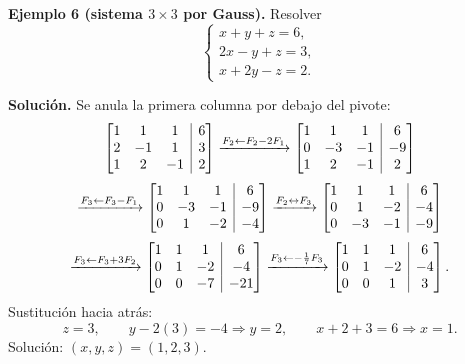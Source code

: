 \documentclass[12pt, letterpaper]{article}
\makeatletter
\newcommand{\mwaug}[2]{\ensuremath{\left[\begin{array}{@{}#1@{}}#2\end{array}\right]}}
\makeatother
\begin{document}
\begin{cuadrosolucion}
  \small
  \textbf{Ejemplo 6 (sistema $3\times3$ por Gauss).} Resolver
  \[
    \begin{cases}
      x+y+z=6,\\
      2x-y+z=3,\\
      x+2y-z=2.
    \end{cases}
  \]

  \medskip
  \textbf{Solución.} Se anula la primera columna por debajo del pivote:
  \[
    \mwaug{ccc|c}{1&1&1&6\\2&-1&1&3\\1&2&-1&2}
    \xrightarrow{F_2\leftarrow F_2-2F_1}
    \mwaug{ccc|c}{1&1&1&6\\0&-3&-1&-9\\1&2&-1&2}
  \]
  \[
    \xrightarrow{F_3\leftarrow F_3-F_1}
    \mwaug{ccc|c}{1&1&1&6\\0&-3&-1&-9\\0&1&-2&-4}
    \xrightarrow{F_2\leftrightarrow F_3}
    \mwaug{ccc|c}{1&1&1&6\\0&1&-2&-4\\0&-3&-1&-9}
  \]
  \[
    \xrightarrow{F_3\leftarrow F_3+3F_2}
    \mwaug{ccc|c}{1&1&1&6\\0&1&-2&-4\\0&0&-7&-21}
    \xrightarrow{F_3\leftarrow-\frac17F_3}
    \mwaug{ccc|c}{1&1&1&6\\0&1&-2&-4\\0&0&1&3}.
  \]
  Sustitución hacia atrás:
  \[
    z=3,\qquad y-2(3)=-4\Rightarrow y=2,\qquad x+2+3=6\Rightarrow x=1.
  \]
  Solución: $(x,y,z)=(1,2,3)$.
\end{cuadrosolucion}
\end{document}
